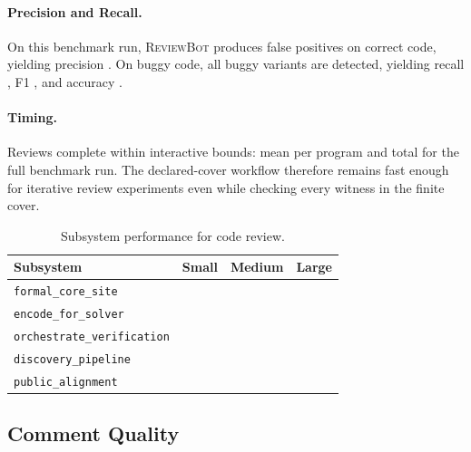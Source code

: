 \documentclass[11pt]{article}
\newcommand{\ReviewBot}{\textsc{ReviewBot}}
\begin{document}
\paragraph{Precision and Recall.}
On this benchmark run, \ReviewBot{} produces \ppLXVIIfalsePositive{} false
positives on correct code, yielding precision \ppLXVIIprecision{}. On buggy
code, all \ppLXVIItruePositive{} buggy variants are detected, yielding recall
\ppLXVIIrecall{}, F1 \ppLXVIIfOne{}, and accuracy \ppLXVIIaccuracyPct{}.

\paragraph{Timing.}
Reviews complete within interactive bounds: mean \ppLXVIItimeMean{} per
program and \ppLXVIItimeTotal{} total for the full benchmark run. The
declared-cover workflow therefore remains fast enough for iterative review
experiments even while checking every witness in the finite cover.

\begin{table}[t]
\centering
\caption{Subsystem performance for code review.}
\label{tab:subsystem-review}
\begin{tabular}{lrrr}
\toprule
\textbf{Subsystem} & \textbf{Small} & \textbf{Medium} & \textbf{Large} \\
\midrule
\texttt{formal\_core\_site} &
  \subFormalcoresiteSmallTime{} & \subFormalcoresiteMediumTime{} &
  \subFormalcoresiteLargeTime{} \\
\texttt{encode\_for\_solver} &
  \subEncodeforsolverSmallTime{} & \subEncodeforsolverMediumTime{} &
  \subEncodeforsolverLargeTime{} \\
\texttt{orchestrate\_verification} &
  \subOrchestrateverificationSmallTime{} &
  \subOrchestrateverificationMediumTime{} &
  \subOrchestrateverificationLargeTime{} \\
\texttt{discovery\_pipeline} &
  \subDiscoverypipelineSmallTime{} & \subDiscoverypipelineMediumTime{} &
  \subDiscoverypipelineLargeTime{} \\
\texttt{public\_alignment} &
  \subPublicalignmentSmallTime{} & \subPublicalignmentMediumTime{} &
  \subPublicalignmentLargeTime{} \\
\bottomrule
\end{tabular}
\end{table}

\subsection{Comment Quality}
\end{document}
